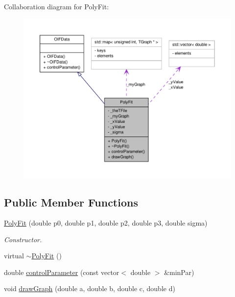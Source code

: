 Collaboration diagram for PolyFit:
\nopagebreak
\begin{figure}[H]
\begin{center}
\leavevmode
\includegraphics[width=400pt]{d6/d22/classPolyFit__coll__graph}
\end{center}
\end{figure}
\subsection*{Public Member Functions}
\begin{DoxyCompactItemize}
\item 
\hyperlink{classPolyFit_abfc9528462669ea53ce08e4945c4ce99}{PolyFit} (double p0, double p1, double p2, double p3, double sigma)
\begin{DoxyCompactList}\small\item\em Constructor. \end{DoxyCompactList}\item 
virtual \hyperlink{classPolyFit_a3462736e02f02d3ab46ccd64aaf235d3}{$\sim$PolyFit} ()
\item 
double \hyperlink{classPolyFit_a5e7833b86023f7497b548711777bc273}{controlParameter} (const vector$<$ double $>$ \&minPar)
\item 
void \hyperlink{classPolyFit_ad90dd471fea18051d5c0c2e5b483f0a5}{drawGraph} (double a, double b, double c, double d)
\end{DoxyCompactItemize}
